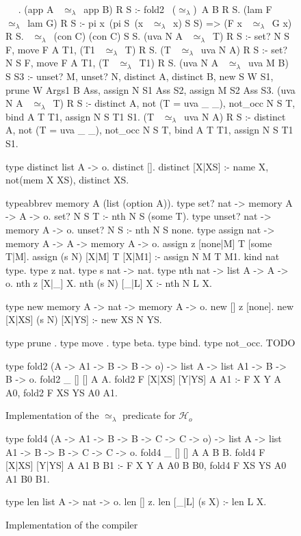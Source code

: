 \documentclass[sigconf,natbib=false]{acmart}
\newcommand{\UnifRel}{\ensuremath{\simeq}}
\newcommand{\Ue}{\ensuremath{\UnifRel_\lambda}\xspace}
\newcommand{\Ho}{\ensuremath{\mathcal{H}_o}\xspace}
\begin{document}
\begin{figure}
\begin{elpicode}
~ \PYG{n+nf}{(\Ue)} ~.
(app A ~\Ue~app B) R S :- fold2 ~(\Ue)~A B R S.
(lam F ~\Ue~lam G) R S :- pi x\ (pi S\ (x ~\Ue~x) S S) => (F x ~\Ue~G x) R S.
~\Ue~(con C) (con C) S S.
(uva N A ~\Ue~T) R S :- set? N S F, move F A T1, (T1 ~\Ue~T) R S.
(T ~\Ue~uva N A) R S :- set? N S F, move F A T1, (T ~\Ue~T1) R S.
(uva N A ~\Ue~uva M B) S S3 :-  unset? M, unset? N,
  distinct A, distinct B, 
  new S W S1, prune W Args1 B Ass, 
  assign N S1 Ass S2, assign M S2 Ass S3.
(uva N A ~\Ue~T) R S :- distinct A, not (T = uva _ _), not_occ N S T,  
  bind A T T1, assign N S T1 S1.
(T ~\Ue~uva N A) R S :- distinct A, not (T = uva _ _), not_occ N S T, 
  bind A T T1, assign N S T1 S1. 
      
type distinct list A -> o.
distinct [].
distinct [X|XS] :- name X, not(mem X XS),
distinct XS.

typeabbrev memory A (list (option A)).
type set? nat -> memory A -> A -> o.
set? N S T :- nth N S (some T).
type unset? nat -> memory A -> o.
unset? N S :- nth N S none.
type assign nat -> memory A -> A -> memory A -> o.
assign z [none|M] T [some T|M].
assign (s N) [X|M] T [X|M1] :- assign N M T M1. 
kind nat type.
type z nat.
type s nat -> nat.
type nth nat -> list A -> A -> o.
nth z [X|_] X.
nth (s N) [_|L] X :- nth N L X.

type new memory A -> nat -> memory A -> o.
new [] z [none].
new [X|XS] (s N) [X|YS] :- new XS N YS.

type prune .
type move .
type beta.
type bind.
type not_occ.
TODO

type fold2 (A -> A1 -> B -> B -> o) -> list A -> list A1 -> B -> B -> o.
fold2 _ [] [] A A.
fold2 F [X|XS] [Y|YS] A A1 :- F X Y A A0, fold2 F XS YS A0 A1.

\end{elpicode}
\caption{Implementation of the \Ue predicate for \Ho}
\label{code:ue-pred}
\end{figure}

\begin{figure}
\begin{elpicode}
type fold4 (A -> A1 -> B -> B -> C -> C -> o) -> list A -> list A1 -> B -> B -> C -> C -> o.
fold4 _ [] [] A A B B.
fold4 F [X|XS] [Y|YS] A A1 B B1 :- F X Y A A0 B B0, fold4 F XS YS A0 A1 B0 B1.

type len list A -> nat -> o.
len [] z.
len [_|L] (s X) :- len L X.

\end{elpicode}
\caption{Implementation of the compiler}
\label{code:ue-pred}
\end{figure}
  
\end{document}
